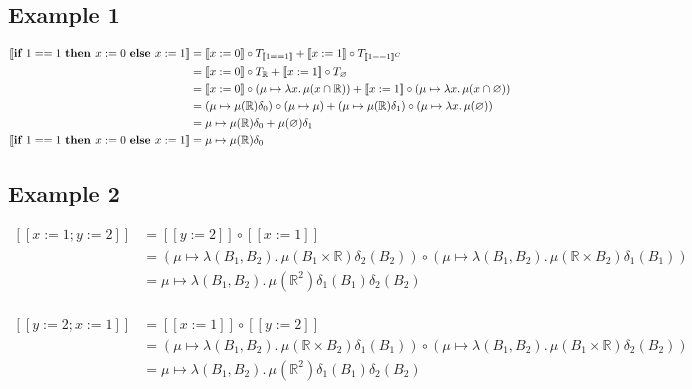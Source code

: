 \documentclass{article}
\begin{document}
		\subsection{Example 1}		
		\begin{equation*}
			\begin{split}
				[\![ \text{\bf if } 1==1 \text{ \bf then } x:=0 \text{ \bf else } x:=1 ]\!] 
				&= [\![x:=0]\!] \circ T_{[\![1==1]\!]} + [\![x:=1]\!] \circ T_{[\![1==1]\!]^C} \\
				&= [\![x:=0]\!] \circ T_{\mathbb{R}} + [\![x:=1]\!] \circ T_{\varnothing} \\
				&= [\![x:=0]\!] \circ (\mu \mapsto \lambda x.\, \mu(x \cap \mathbb{R})) + [\![x:=1]\!] \circ (\mu \mapsto \lambda x.\, \mu(x \cap \varnothing)) \\
				&= (\mu \mapsto \mu(\mathbb{R})\delta_0) \circ (\mu \mapsto \mu) + (\mu \mapsto \mu(\mathbb{R})\delta_1) \circ (\mu \mapsto \lambda x.\, \mu(\varnothing))  \\
				&= \mu \mapsto \mu(\mathbb{R})\delta_0 + \mu(\varnothing)\delta_1 \\
				[\![ \text{\bf if } 1==1 \text{ \bf then } x:=0 \text{ \bf else } x:=1 ]\!] 
				&= \mu \mapsto \mu(\mathbb{R})\delta_0 \\
			\end{split}
		\end{equation*}
		
		\subsection{Example 2}
		\begin{equation*}
			\begin{split}
				[\![ x := 1; y := 2 ]\!]&= [\![y := 2]\!] \circ [\![x := 1]\!] \\
				&= (\mu \mapsto \lambda (B_1,  B_2).\, \mu(B_1 \times \mathbb{R})\delta_2(B_2)) \circ (\mu \mapsto \lambda (B_1,  B_2).\, \mu(\mathbb{R} \times B_2)\delta_1(B_1)) \\
				&= \mu \mapsto \lambda (B_1, B_2).\, \mu(\mathbb{R}^2) \delta_1(B_1)\delta_2(B_2) \\
			\end{split}
		\end{equation*}
		
		\begin{equation*}
			\begin{split}
				[\![ y := 2; x := 1 ]\!]&= [\![x := 1]\!] \circ [\![y := 2]\!] \\
				&= (\mu \mapsto \lambda (B_1,  B_2).\, \mu(\mathbb{R} \times B_2)\delta_1(B_1)) \circ (\mu \mapsto \lambda (B_1,  B_2).\, \mu(B_1 \times \mathbb{R})\delta_2(B_2)) \\
				&= \mu \mapsto \lambda (B_1, B_2).\, \mu(\mathbb{R}^2) \delta_1(B_1)\delta_2(B_2) \\
			\end{split}
		\end{equation*}
		
\end{document}

